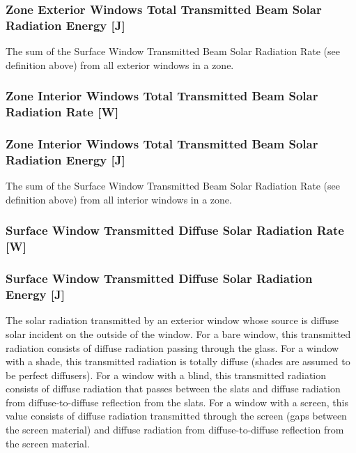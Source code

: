 \subsubsection{Zone Exterior Windows Total Transmitted Beam Solar Radiation Energy {[}J{]}}\label{zone-exterior-windows-total-transmitted-beam-solar-radiation-energy-j}

The sum of the Surface Window Transmitted Beam Solar Radiation Rate (see definition above) from all exterior windows in a zone.

\subsubsection{Zone Interior Windows Total Transmitted Beam Solar Radiation Rate {[}W{]}}\label{zone-interior-windows-total-transmitted-beam-solar-radiation-rate-w}

\subsubsection{Zone Interior Windows Total Transmitted Beam Solar Radiation Energy {[}J{]}}\label{zone-interior-windows-total-transmitted-beam-solar-radiation-energy-j}

The sum of the Surface Window Transmitted Beam Solar Radiation Rate (see definition above) from all interior windows in a zone.

\subsubsection{Surface Window Transmitted Diffuse Solar Radiation Rate {[}W{]}}\label{surface-window-transmitted-diffuse-solar-radiation-rate-w}

\subsubsection{Surface Window Transmitted Diffuse Solar Radiation Energy {[}J{]}}\label{surface-window-transmitted-diffuse-solar-radiation-energy-j}

The solar radiation transmitted by an exterior window whose source is diffuse solar incident on the outside of the window. For a bare window, this transmitted radiation consists of diffuse radiation passing through the glass. For a window with a shade, this transmitted radiation is totally diffuse (shades are assumed to be perfect diffusers). For a window with a blind, this transmitted radiation consists of diffuse radiation that passes between the slats and diffuse radiation from diffuse-to-diffuse reflection from the slats. For a window with a screen, this value consists of diffuse radiation transmitted through the screen (gaps between the screen material) and diffuse radiation from diffuse-to-diffuse reflection from the screen material.

